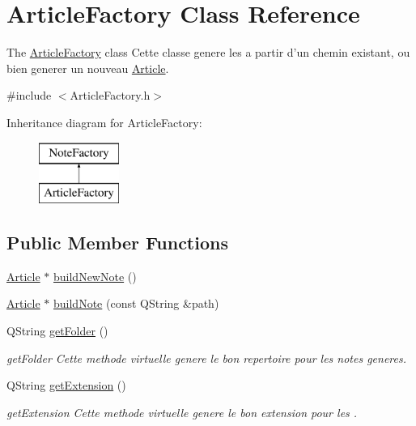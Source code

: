 \hypertarget{class_article_factory}{\section{Article\-Factory Class Reference}
\label{class_article_factory}
}


The \hyperlink{class_article_factory}{Article\-Factory} class Cette classe genere les  a partir d'un chemin existant, ou bien generer un nouveau \hyperlink{class_article}{Article}.  




{\ttfamily \#include $<$Article\-Factory.\-h$>$}

Inheritance diagram for Article\-Factory\-:\begin{figure}[H]
\begin{center}
\leavevmode
\includegraphics[height=2.000000cm]{class_article_factory}
\end{center}
\end{figure}
\subsection*{Public Member Functions}
\begin{DoxyCompactItemize}
\item 
\hyperlink{class_article}{Article} $\ast$ \hyperlink{class_article_factory_a8824186f7bb657bcb998043d75dba5ce}{build\-New\-Note} ()
\item 
\hyperlink{class_article}{Article} $\ast$ \hyperlink{class_article_factory_a02a835ec863b81352d532f5d93a30c4e}{build\-Note} (const Q\-String \&path)
\item 
Q\-String \hyperlink{class_article_factory_a6187f12741c87e2263731c25c1820b3c}{get\-Folder} ()
\begin{DoxyCompactList}\small\item\em get\-Folder Cette methode virtuelle genere le bon repertoire pour les notes generes. \end{DoxyCompactList}\item 
Q\-String \hyperlink{class_article_factory_a7c286cb7fe60c9c91456ae65d6b80cf8}{get\-Extension} ()
\begin{DoxyCompactList}\small\item\em get\-Extension Cette methode virtuelle genere le bon extension pour les . \end{DoxyCompactList}\end{DoxyCompactItemize}
